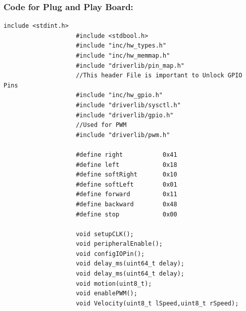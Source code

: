 \documentclass[a4paper,10pt,oneside]{article}
\begin{document}
				\subsubsection{\textbf{Code for Plug and Play Board:}}
				\begin{lstlisting}[style=CStyle]
					include <stdint.h>
					#include <stdbool.h>
					#include "inc/hw_types.h"
					#include "inc/hw_memmap.h"
					#include "driverlib/pin_map.h"
					//This header File is important to Unlock GPIO Pins
					#include "inc/hw_gpio.h"
					#include "driverlib/sysctl.h"
					#include "driverlib/gpio.h"
					//Used for PWM
					#include "driverlib/pwm.h"
					
					#define right           0x41
					#define left            0x18
					#define softRight       0x10
					#define softLeft        0x01
					#define forward         0x11
					#define backward        0x48
					#define stop            0x00
					
					void setupCLK();
					void peripheralEnable();
					void configIOPin();
					void delay_ms(uint64_t delay);
					void delay_ms(uint64_t delay);
					void motion(uint8_t);
					void enablePWM();
					void Velocity(uint8_t lSpeed,uint8_t rSpeed);
					

\end{lstlisting}
\end{document}
